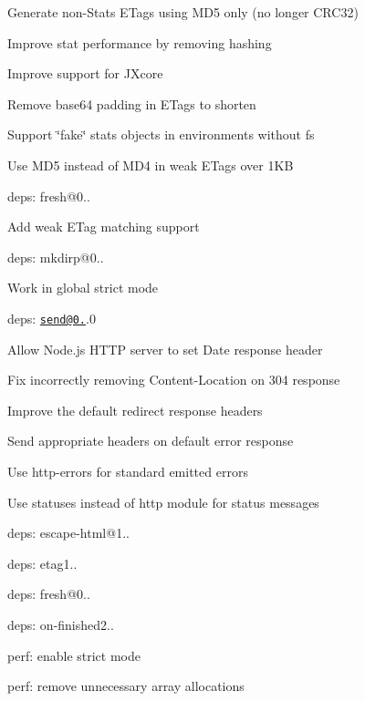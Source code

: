 {\begin{DoxyItemize}
\begin{DoxyItemize}
\item Generate non-\/\+Stats E\+Tags using M\+D5 only (no longer C\+R\+C32)
\item Improve stat performance by removing hashing
\item Improve support for J\+Xcore
\item Remove base64 padding in E\+Tags to shorten
\item Support \char`\"{}fake\char`\"{} stats objects in environments without fs
\item Use M\+D5 instead of M\+D4 in weak E\+Tags over 1\+KB
\end{DoxyItemize}
\item deps\+: fresh@0..
\begin{DoxyItemize}
\item Add weak {\ttfamily E\+Tag} matching support
\end{DoxyItemize}
\item deps\+: mkdirp@0..
\begin{DoxyItemize}
\item Work in global strict mode
\end{DoxyItemize}
\item deps\+: \href{mailto:send@0.13}{\tt send@0.}.0
\begin{DoxyItemize}
\item Allow Node.\+js H\+T\+TP server to set {\ttfamily Date} response header
\item Fix incorrectly removing {\ttfamily Content-\/\+Location} on 304 response
\item Improve the default redirect response headers
\item Send appropriate headers on default error response
\item Use {\ttfamily http-\/errors} for standard emitted errors
\item Use {\ttfamily statuses} instead of {\ttfamily http} module for status messages
\item deps\+: escape-\/html@1..
\item deps\+: etag1..
\item deps\+: fresh@0..
\item deps\+: on-\/finished2..
\item perf\+: enable strict mode
\item perf\+: remove unnecessary array allocations
\end{DoxyItemize}
\end{DoxyItemize}}


